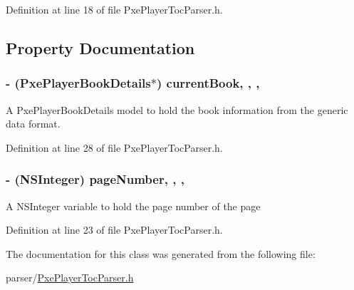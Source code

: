 Definition at line 18 of file Pxe\-Player\-Toc\-Parser.\-h.



\subsection{Property Documentation}
\hypertarget{interface_pxe_player_toc_parser_af92fc7c7e30af7e59a5d660d29ad7a02}{
\subsubsection[{current\-Book}]{\setlength{\rightskip}{0pt plus 5cm}-\/ (Pxe\-Player\-Book\-Details$\ast$) current\-Book\hspace{0.3cm}{\ttfamily [read]}, {\ttfamily [write]}, {\ttfamily [nonatomic]}, {\ttfamily [strong]}}}\label{interface_pxe_player_toc_parser_af92fc7c7e30af7e59a5d660d29ad7a02}
A Pxe\-Player\-Book\-Details model to hold the book information from the generic data format. 

Definition at line 28 of file Pxe\-Player\-Toc\-Parser.\-h.

\hypertarget{interface_pxe_player_toc_parser_a4b7effc62fd499caf2df1fbd7a82b264}{
\subsubsection[{page\-Number}]{\setlength{\rightskip}{0pt plus 5cm}-\/ (N\-S\-Integer) page\-Number\hspace{0.3cm}{\ttfamily [read]}, {\ttfamily [write]}, {\ttfamily [nonatomic]}, {\ttfamily [assign]}}}\label{interface_pxe_player_toc_parser_a4b7effc62fd499caf2df1fbd7a82b264}
A N\-S\-Integer variable to hold the page number of the page 

Definition at line 23 of file Pxe\-Player\-Toc\-Parser.\-h.



The documentation for this class was generated from the following file\-:\begin{DoxyCompactItemize}
\item 
parser/\hyperlink{_pxe_player_toc_parser_8h}{Pxe\-Player\-Toc\-Parser.\-h}\end{DoxyCompactItemize}
